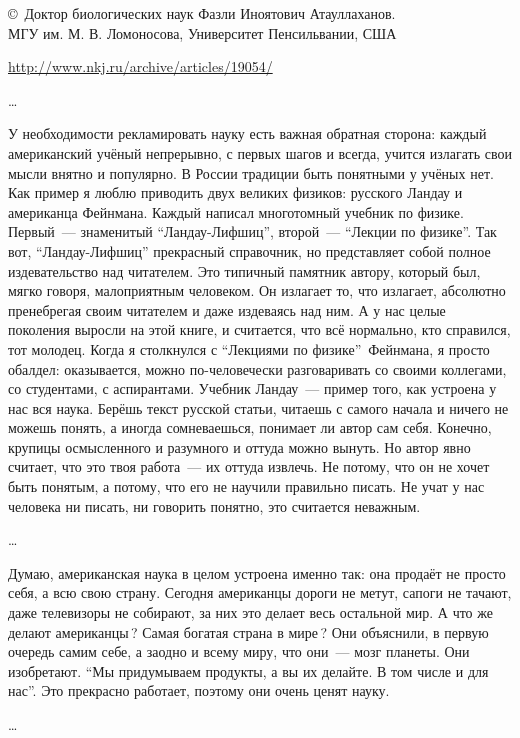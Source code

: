 
\copyright\ Доктор биологических наук Фазли Иноятович Атауллаханов.\\
МГУ им. М. В. Ломоносова, Университет Пенсильвании, США

\bigskip 
\url{http://www.nkj.ru/archive/articles/19054/}
\bigskip 

\ldots

У необходимости рекламировать науку есть важная обратная сторона: каждый
американский учёный непрерывно, с первых шагов и всегда, учится излагать свои
мысли внятно и популярно. В России традиции быть понятными у учёных нет. Как
пример я люблю приводить двух великих физиков: русского Ландау и американца
Фейнмана. Каждый написал многотомный учебник по физике. Первый\ --- знаменитый
``Ландау-Лифшиц'', второй\ --- ``Лекции по физике''. Так вот, ``Ландау-Лифшиц''
прекрасный справочник, но представляет собой полное издевательство над
читателем. Это типичный памятник автору, который был, мягко говоря, малоприятным
человеком. Он излагает то, что излагает, абсолютно пренебрегая своим читателем и
даже издеваясь над ним. А у нас целые поколения выросли на этой книге, и
считается, что всё нормально, кто справился, тот молодец. Когда я столкнулся с
``Лекциями по физике''\ Фейнмана, я просто обалдел: оказывается, можно
по-человечески разговаривать со своими коллегами, со студентами, с аспирантами.
Учебник Ландау\ --- пример того, как устроена у нас вся наука. Берёшь текст
русской статьи, читаешь с самого начала и ничего не можешь понять, а иногда
сомневаешься, понимает ли автор сам себя. Конечно, крупицы осмысленного и
разумного и оттуда можно вынуть. Но автор явно считает, что это твоя работа\ ---
их оттуда извлечь. Не потому, что он не хочет быть понятым, а потому, что его не
научили правильно писать. Не учат у нас человека ни писать, ни говорить понятно,
это считается неважным.

\ldots

Думаю, американская наука в целом устроена именно так: она продаёт не просто
себя, а всю свою страну. Сегодня американцы дороги не метут, сапоги не тачают,
даже телевизоры не собирают, за них это делает весь остальной мир. А что же
делают американцы\,? Самая богатая страна в мире\,? Они объяснили, в первую
очередь самим себе, а заодно и всему миру, что они\ --- мозг планеты. Они
изобретают. ``Мы придумываем продукты, а вы их делайте. В том числе и для нас''.
Это прекрасно работает, поэтому они очень ценят науку.

\ldots